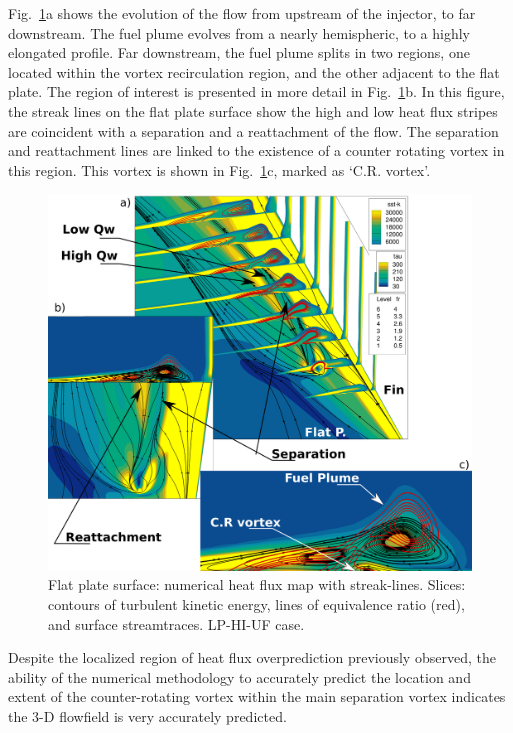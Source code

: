 \documentclass{AIAA}
\begin{document}
Fig.~\ref{fig:Exper_Flowf}a shows the evolution of the flow from upstream of the injector, to far downstream.
The fuel plume evolves from a nearly hemispheric, to a highly elongated profile.
Far downstream, the fuel plume splits in two regions, one located within the vortex recirculation region, and the other adjacent to the flat plate.
The region of interest is presented in more detail in Fig.~\ref{fig:Exper_Flowf}b.
In this figure, the streak lines on the flat plate surface show the high and low heat flux stripes are coincident with a separation and a reattachment of the flow.
The separation and reattachment lines are linked to the existence of a counter rotating vortex in this region.
This vortex is shown in Fig.~\ref{fig:Exper_Flowf}c, marked as `C.R. vortex'.


\begin{figure}[!h]
\center
\includegraphics[trim = 0mm 0mm 0mm 0mm, clip, width=0.95\columnwidth,valign=t]{Figures/Flowfield_Experimental_Vred.pdf}
\caption{Flat plate surface: numerical heat flux map with streak-lines. Slices: contours of turbulent kinetic energy, lines of equivalence ratio (red), and surface streamtraces. LP-HI-UF case.}
\label{fig:Exper_Flowf}
\end{figure} 


Despite the localized region of heat flux overprediction previously observed, the ability of the numerical methodology to accurately predict the location and extent of the counter-rotating vortex within the main separation vortex indicates the 3-D flowfield is very accurately predicted.
\end{document}
